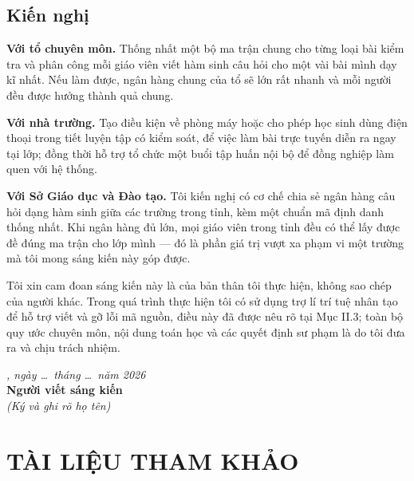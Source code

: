 \subsection{Kiến nghị}

\textbf{Với tổ chuyên môn.} Thống nhất một bộ ma trận chung cho từng loại bài
kiểm tra và phân công mỗi giáo viên viết hàm sinh câu hỏi cho một vài bài mình
dạy kĩ nhất. Nếu làm được, ngân hàng chung của tổ sẽ lớn rất nhanh và mỗi người
đều được hưởng thành quả chung.

\textbf{Với nhà trường.} Tạo điều kiện về phòng máy hoặc cho phép học sinh dùng
điện thoại trong tiết luyện tập có kiểm soát, để việc làm bài trực tuyến diễn
ra ngay tại lớp; đồng thời hỗ trợ tổ chức một buổi tập huấn nội bộ để đồng
nghiệp làm quen với hệ thống.

\textbf{Với Sở Giáo dục và Đào tạo.} Tôi kiến nghị có cơ chế chia sẻ ngân hàng
câu hỏi dạng hàm sinh giữa các trường trong tỉnh, kèm một chuẩn mã định danh
thống nhất. Khi ngân hàng đủ lớn, mọi giáo viên trong tỉnh đều có thể lấy được
đề đúng ma trận cho lớp mình --- đó là phần giá trị vượt xa phạm vi một trường
mà tôi mong sáng kiến này góp được.

\bigskip
\noindent Tôi xin cam đoan sáng kiến này là của bản thân tôi thực hiện, không
sao chép của người khác. Trong quá trình thực hiện tôi có sử dụng trợ lí trí
tuệ nhân tạo để hỗ trợ viết và gỡ lỗi mã nguồn, điều này đã được nêu rõ tại Mục
II.3; toàn bộ quy ước chuyên môn, nội dung toán học và các quyết định sư phạm
là do tôi đưa ra và chịu trách nhiệm.

\vspace{1cm}
\begin{flushright}
\begin{minipage}{6cm}
\centering
\textit{\DIADIEM, ngày \dots\ tháng \dots\ năm 2026}\\[2pt]
\textbf{Người viết sáng kiến}\\
\textit{(Ký và ghi rõ họ tên)}\\[2.5cm]
\TACGIA
\end{minipage}
\end{flushright}

\clearpage

\section*{TÀI LIỆU THAM KHẢO}
\setcounter{secnumdepth}{0}

